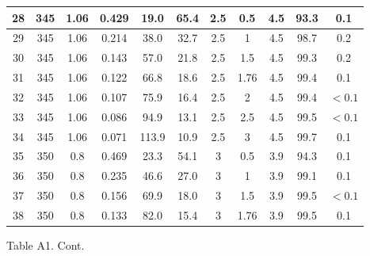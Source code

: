\documentclass[10pt]{article}
\begin{document}
\begin{center}
\begin{tabular}{|c|c|c|c|c|c|c|c|c|c|c|}
\hline
28 & 345 & 1.06 & 0.429 & 19.0 & 65.4 & 2.5 & 0.5 & 4.5 & 93.3 & 0.1 \\
\hline
29 & 345 & 1.06 & 0.214 & 38.0 & 32.7 & 2.5 & 1 & 4.5 & 98.7 & 0.2 \\
\hline
30 & 345 & 1.06 & 0.143 & 57.0 & 21.8 & 2.5 & 1.5 & 4.5 & 99.3 & 0.2 \\
\hline
31 & 345 & 1.06 & 0.122 & 66.8 & 18.6 & 2.5 & 1.76 & 4.5 & 99.4 & 0.1 \\
\hline
32 & 345 & 1.06 & 0.107 & 75.9 & 16.4 & 2.5 & 2 & 4.5 & 99.4 & $<0.1$ \\
\hline
33 & 345 & 1.06 & 0.086 & 94.9 & 13.1 & 2.5 & 2.5 & 4.5 & 99.5 & $<0.1$ \\
\hline
34 & 345 & 1.06 & 0.071 & 113.9 & 10.9 & 2.5 & 3 & 4.5 & 99.7 & 0.1 \\
\hline
35 & 350 & 0.8 & 0.469 & 23.3 & 54.1 & 3 & 0.5 & 3.9 & 94.3 & 0.1 \\
\hline
36 & 350 & 0.8 & 0.235 & 46.6 & 27.0 & 3 & 1 & 3.9 & 99.1 & 0.1 \\
\hline
37 & 350 & 0.8 & 0.156 & 69.9 & 18.0 & 3 & 1.5 & 3.9 & 99.5 & $<0.1$ \\
\hline
38 & 350 & 0.8 & 0.133 & 82.0 & 15.4 & 3 & 1.76 & 3.9 & 99.5 & 0.1 \\
\hline
\end{tabular}
\end{center}

Table A1. Cont.
\end{document}
